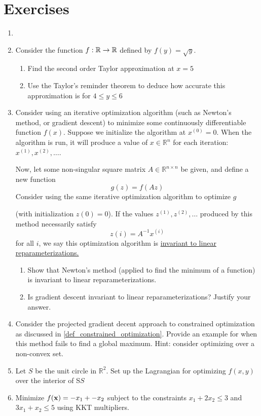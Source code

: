 \section{Exercises}

\begin{enumerate}
    \item 
    \item Consider the function $f: \R \to \R$ defined by $f(y) = \sqrt{y}$. 
    \begin{enumerate}
        \item Find the second order Taylor approximation at $x=5$
        \item Use the Taylor's reminder theorem to deduce how accurate this approximation is for $4 \leq y \leq 6$
    \end{enumerate}
\item Consider using an iterative optimization algorithm (such as Newton’s method, or gradient descent) to minimize some continuously differentiable function $f(x)$. Suppose we initialize the
algorithm at $x^{(0)} = 0$. When the algorithm is run, it will produce a value of $x \in \mathbb R^n$ for each iteration: $ x^{(1)}, x^{(2)}, \ldots$.

Now, let some non-singular square matrix $A \in \mathbb R^{n \times n}$ be given, and define a new function 
$$g(z) = f(Az)$$
Consider using the same iterative optimization algorithm to optimize $g$ 

(with initialization $z(0) = 0$). If the values $z^{(1)},z^{(2)},\ldots$ produced by this method necessarily satisfy
$$z(i) = A^{-1} x^{(i)}$$ for all $i$, we say this optimization algorithm is \underline{invariant to linear reparameterizations.}

\begin{enumerate}
\item Show that Newton’s method (applied to find the minimum of a function) is invariant to linear reparameterizations.
\item Is gradient descent invariant to linear reparameterizations? Justify your answer.
\end{enumerate}

\item Consider the projected gradient decent approach to constrained optimization as discussed in \ref{def_constrained_optimization}. Provide an example for when this method fails to find a global maximum. Hint: consider optimizing over a non-convex set.
\item Let $S$ be the unit circle in $\mathbb R^2$. Set up the Lagrangian for optimizing $f(x,y)$ over the interior of S$S$ 
\item Minimize $f(\vx) = -x_1 + -x_2$ subject to the constraints $x_1 + 2x_2 \leq 3$ and $3x_1 + x_2 \leq 5$ using KKT multipliers. 

\end{enumerate}

